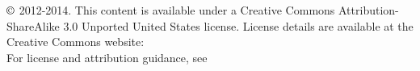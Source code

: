\chapter*{}
\vfill


\noindent $\copyright$ 2012-2014. This content is available under a Creative Commons Attribution-ShareAlike 3.0 Unported United States license. License details are available at the Creative Commons website:  \\

\noindent For license and attribution guidance, see 
